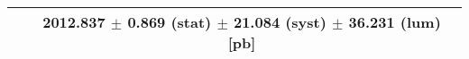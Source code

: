 \begin{tabular}{lc}
\hline
                               & 2012.837 $\pm$ 0.869 (stat) $\pm$ 21.084 (syst) $\pm$ 36.231 (lum) [pb]  \\
\hline
\end{tabular}
